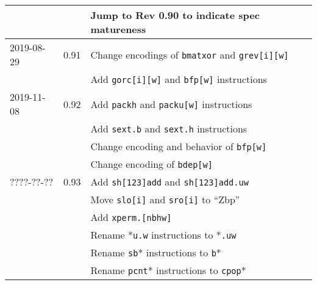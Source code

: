 \documentclass[twoside,11pt]{book}
\begin{document}
\begin{center}
\begin{tabular}{lll}
           &      & Jump to Rev 0.90 to indicate spec matureness \\
\hline
2019-08-29 & 0.91 & Change encodings of {\tt bmatxor} and {\tt grev[i][w]} \\
	   &      & Add {\tt gorc[i][w]} and {\tt bfp[w]} instructions \\
\hline
2019-11-08 & 0.92 & Add {\tt packh} and {\tt packu[w]} instructions \\
	   &      & Add {\tt sext.b} and {\tt sext.h} instructions \\
	   &      & Change encoding and behavior of {\tt bfp[w]} \\
	   &      & Change encoding of {\tt bdep[w]} \\
\hline
????-??-?? & 0.93 & Add {\tt sh[123]add} and {\tt sh[123]add.uw} \\
	   &      & Move {\tt slo[i]} and {\tt sro[i]} to ``Zbp'' \\
	   &      & Add {\tt xperm.[nbhw]} \\
	   &      & Rename *{\tt u.w} instructions to *{\tt .uw} \\
	   &      & Rename {\tt sb}* instructions to {\tt b}* \\
	   &      & Rename {\tt pcnt}* instructions to {\tt cpop}* \\
\hline
\end{tabular}
\end{center}



\end{document}
